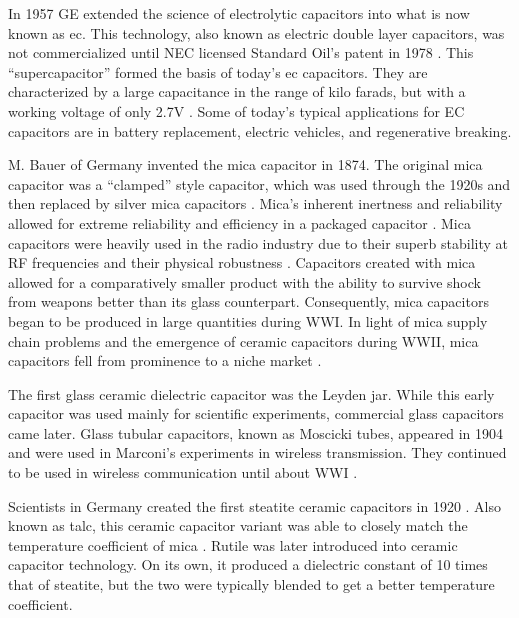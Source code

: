 In 1957 GE extended the science of electrolytic capacitors into what is now known as \gls{ec}. This technology, also known as electric double layer capacitors, was not commercialized until NEC licensed Standard Oil's patent in 1978 \cite{electrochem_intro}. This ``supercapacitor'' formed the basis of today's \gls{ec} capacitors. They are characterized by a large capacitance in the range of kilo farads, but with a working voltage of only 2.7V \cite{electrochem_intro}. Some of today's typical applications for EC capacitors are in battery replacement, electric vehicles, and regenerative breaking.

\nocite{hh}
\nocite{capGuide_mica}
M. Bauer of Germany invented the mica capacitor in 1874. The original mica capacitor was a ``clamped'' style capacitor, which was used through the 1920s \cite{wiki_mica} and then replaced by silver mica capacitors \cite{learn_caps}.
Mica's inherent inertness and reliability allowed for extreme reliability and efficiency in a packaged capacitor \cite{tedds_mica}. Mica capacitors were heavily used in the radio industry due to their superb stability at RF frequencies and their physical robustness \cite{radio_mica}.
Capacitors created with mica allowed for a comparatively smaller product \cite[f.~37-41]{dumInv} with the ability to survive shock from weapons better than its glass counterpart. Consequently, mica capacitors began to be produced in large quantities during WWI.
In light of mica supply chain problems and the emergence of ceramic capacitors during WWII, mica capacitors fell from prominence to a niche market \cite[Ch 3, Sec II]{cerMaterials}.

The first glass ceramic dielectric capacitor was the Leyden jar. While this early capacitor was used mainly for scientific experiments, commercial glass capacitors came later.
Glass tubular capacitors, known as Moscicki tubes, appeared in 1904 and were used in Marconi's experiments in wireless transmission. They continued to be used in wireless communication until about WWI \cite[p.~102]{dumInv}.

Scientists in Germany created the first steatite ceramic capacitors in 1920 \cite[Ch 3 Sec II]{cerMaterials}\cite{cerDie}. Also known as talc, this ceramic capacitor variant was able to closely match the temperature coefficient of mica \cite{steatite_hf}. Rutile was later introduced into ceramic capacitor technology. On its own, it produced a dielectric constant of 10 times that of steatite, but the two were typically blended to get a better temperature coefficient.

